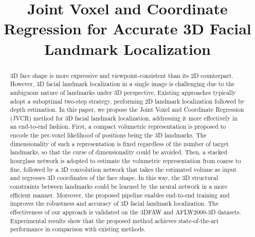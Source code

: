 \documentclass[a4paper,conference]{IEEEtran}
\begin{document}
\title{Joint Voxel and Coordinate Regression for Accurate 3D Facial Landmark Localization}


\author{
}

\maketitle

\begin{abstract}
3D face shape is more expressive and viewpoint-consistent than its 2D counterpart. However, 3D facial landmark localization in a single image is challenging due to the ambiguous nature of landmarks under 3D perspective. Existing approaches typically adopt a suboptimal two-step strategy, performing 2D landmark localization followed by depth estimation. In this paper, we propose the Joint Voxel and Coordinate Regression (JVCR) method for 3D facial landmark localization, addressing it more effectively in an end-to-end fashion. First, a compact volumetric representation is proposed to encode the per-voxel likelihood of positions being the 3D landmarks. The dimensionality of such a representation is fixed regardless of the number of target landmarks, so that the curse of dimensionality could be avoided. Then, a stacked hourglass network is adopted to estimate the volumetric representation from coarse to fine, followed by a 3D convolution network that takes the estimated volume as input and regresses 3D coordinates of the face shape. In this way, the 3D structural constraints between landmarks could be learned by the neural network in a more efficient manner. Moreover, the proposed pipeline enables end-to-end training and improves the robustness and accuracy of 3D facial landmark localization. The effectiveness of our approach is validated on the 3DFAW and AFLW2000-3D datasets. Experimental results show that the proposed method achieves state-of-the-art performance in comparison with existing methods.
\end{abstract}
\end{document}
